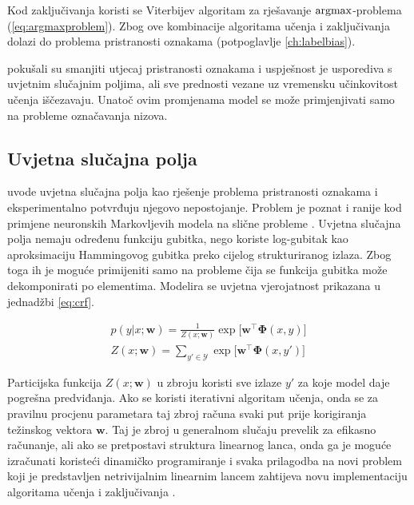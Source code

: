 Kod zaključivanja koristi se Viterbijev algoritam za rješavanje $\operatorname*{argmax}$-problema
(\ref{eq:argmaxproblem}). Zbog ove kombinacije algoritama učenja i zaključivanja
dolazi do problema pristranosti oznakama (potpoglavlje \ref{ch:labelbias}).

\cite{cohen05ijcai} pokušali su smanjiti utjecaj pristranosti oznakama i
uspješnost je usporediva s uvjetnim slučajnim poljima, ali sve prednosti vezane
uz vremensku učinkovitost učenja iščezavaju. Unatoč ovim promjenama model se
može primjenjivati samo na probleme označavanja nizova.


\subsection{Uvjetna slučajna polja}

\citet*{lafferty2001conditional} uvode uvjetna slučajna polja kao rješenje
problema pristranosti oznakama i eksperimentalno potvrđuju njegovo nepostojanje.
Problem je poznat i ranije kod primjene neuronskih Markovljevih modela na slične
probleme \citep{leon1991approche}. Uvjetna slučajna polja nemaju određenu
funkciju gubitka, nego koriste log-gubitak kao aproksimaciju Hammingovog gubitka
preko cijelog strukturiranog izlaza. Zbog toga ih je moguće primijeniti samo na
probleme čija se funkcija gubitka može dekomponirati po elementima. Modelira se
uvjetna vjerojatnost prikazana u jednadžbi \ref{eq:crf}.

\begin{equation}\label{eq:crf}
\begin{aligned}
  p(y | x; \mathbf{w}) = \frac{1}{Z(x; \mathbf{w})} \exp \big[ \mathbf{w}^\top \mathbf{\Phi}(x, y)\big] \\
  Z(x; \mathbf{w}) = \sum_{y' \in \mathcal{Y}} \exp \big[ \mathbf{w}^\top \mathbf{\Phi}(x, y')\big]
\end{aligned}
\end{equation}

\noindent
Particijska funkcija $Z(x; \mathbf{w})$ u zbroju koristi sve izlaze $y'$ za koje
model daje pogrešna predviđanja. Ako se koristi iterativni algoritam učenja, onda
se za pravilnu procjenu parametara taj zbroj računa svaki put prije korigiranja
težinskog vektora $\mathbf{w}$. Taj je zbroj u generalnom slučaju prevelik za
efikasno računanje, ali ako se pretpostavi struktura linearnog lanca, onda ga je
moguće izračunati koristeći dinamičko programiranje i svaka prilagodba na novi
problem koji je predstavljen netrivijalnim linearnim lancem zahtijeva novu
implementaciju algoritama učenja i zaključivanja \citep{lafferty2001conditional,
sha2003shallow}.

